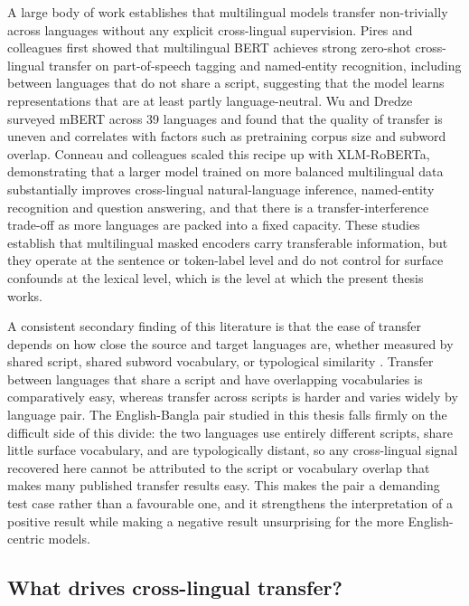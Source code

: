 A large body of work establishes that multilingual models transfer non-trivially across languages without any explicit cross-lingual supervision. Pires and colleagues \cite{pires2019mbert} first showed that multilingual BERT achieves strong zero-shot cross-lingual transfer on part-of-speech tagging and named-entity recognition, including between languages that do not share a script, suggesting that the model learns representations that are at least partly language-neutral. Wu and Dredze \cite{wu2020emerging} surveyed mBERT across 39 languages and found that the quality of transfer is uneven and correlates with factors such as pretraining corpus size and subword overlap. Conneau and colleagues \cite{conneau2020xlmr} scaled this recipe up with XLM-RoBERTa, demonstrating that a larger model trained on more balanced multilingual data substantially improves cross-lingual natural-language inference, named-entity recognition and question answering, and that there is a transfer-interference trade-off as more languages are packed into a fixed capacity. These studies establish that multilingual masked encoders carry transferable information, but they operate at the sentence or token-label level and do not control for surface confounds at the lexical level, which is the level at which the present thesis works.

A consistent secondary finding of this literature is that the ease of transfer depends on how close the source and target languages are, whether measured by shared script, shared subword vocabulary, or typological similarity \cite{pires2019mbert,wu2020emerging}. Transfer between languages that share a script and have overlapping vocabularies is comparatively easy, whereas transfer across scripts is harder and varies widely by language pair. The English-Bangla pair studied in this thesis falls firmly on the difficult side of this divide: the two languages use entirely different scripts, share little surface vocabulary, and are typologically distant, so any cross-lingual signal recovered here cannot be attributed to the script or vocabulary overlap that makes many published transfer results easy. This makes the pair a demanding test case rather than a favourable one, and it strengthens the interpretation of a positive result while making a negative result unsurprising for the more English-centric models.

\subsection{What drives cross-lingual transfer?}

